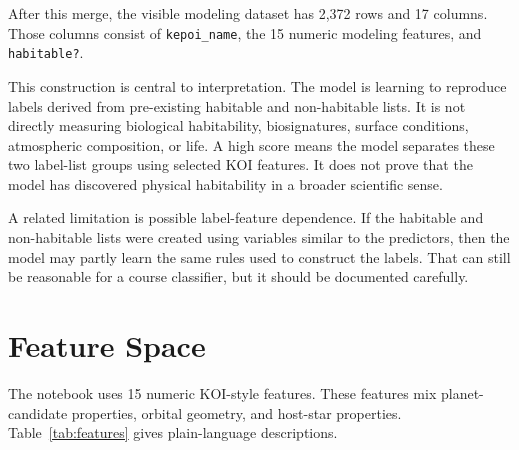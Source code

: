 \documentclass[11pt]{article}
\begin{document}
After this merge, the visible modeling dataset has 2,372 rows and 17 columns. Those columns consist of \texttt{kepoi\_name}, the 15 numeric modeling features, and \texttt{habitable?}.

This construction is central to interpretation. The model is learning to reproduce labels derived from pre-existing habitable and non-habitable lists. It is not directly measuring biological habitability, biosignatures, surface conditions, atmospheric composition, or life. A high score means the model separates these two label-list groups using selected KOI features. It does not prove that the model has discovered physical habitability in a broader scientific sense.

A related limitation is possible label-feature dependence. If the habitable and non-habitable lists were created using variables similar to the predictors, then the model may partly learn the same rules used to construct the labels. That can still be reasonable for a course classifier, but it should be documented carefully.

\section{Feature Space}

The notebook uses 15 numeric KOI-style features. These features mix planet-candidate properties, orbital geometry, and host-star properties. Table~\ref{tab:features} gives plain-language descriptions.
\end{document}
